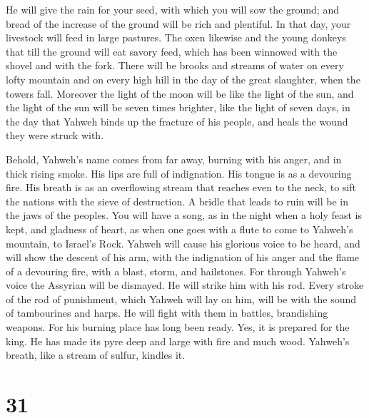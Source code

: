  He will give the rain for your seed, with which you will
sow the ground; and bread of the increase of the ground will be rich and
plentiful. In that day, your livestock will feed in large pastures.
 The oxen likewise and the young donkeys that till the
ground will eat savory feed, which has been winnowed with the shovel and
with the fork.  There will be brooks and streams of water
on every lofty mountain and on every high hill in the day of the great
slaughter, when the towers fall.  Moreover the light of the
moon will be like the light of the sun, and the light of the sun will be
seven times brighter, like the light of seven days, in the day that
Yahweh binds up the fracture of his people, and heals the wound they
were struck with.

 Behold, Yahweh's name comes from far away, burning with
his anger, and in thick rising smoke. His lips are full of indignation.
His tongue is as a devouring fire.  His breath is as an
overflowing stream that reaches even to the neck, to sift the nations
with the sieve of destruction. A bridle that leads to ruin will be in
the jaws of the peoples.  You will have a song, as in the
night when a holy feast is kept, and gladness of heart, as when one goes
with a flute to come to Yahweh's mountain, to Israel's Rock.
 Yahweh will cause his glorious voice to be heard, and will
show the descent of his arm, with the indignation of his anger and the
flame of a devouring fire, with a blast, storm, and hailstones.
 For through Yahweh's voice the Assyrian will be dismayed.
He will strike him with his rod.  Every stroke of the rod
of punishment, which Yahweh will lay on him, will be with the sound of
tambourines and harps. He will fight with them in battles, brandishing
weapons.  For his burning place has long been ready. Yes,
it is prepared for the king. He has made its pyre deep and large with
fire and much wood. Yahweh's breath, like a stream of sulfur, kindles
it.

\hypertarget{section-30}{%
\section{31}\label{section-30}}

